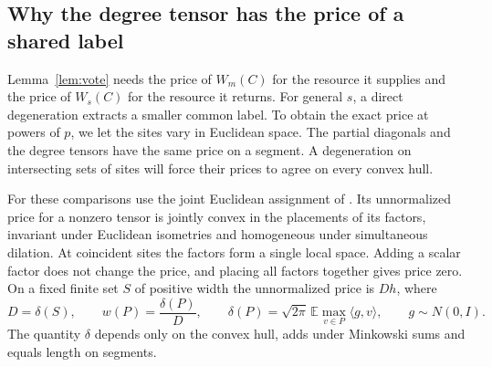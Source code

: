\subsection{Why the degree tensor has the price of a shared label}\label{sec:degree}

Lemma~\ref{lem:vote} needs the price of \(W_m(C)\) for the resource it
supplies and the price of \(W_s(C)\) for the resource it returns. For
general \(s\), a direct degeneration extracts a smaller common label.
To obtain the exact price at powers of \(p\), we let the sites vary in
Euclidean space. The partial diagonals and the degree tensors have
the same price on a segment. A degeneration on intersecting sets of
sites will force their prices to agree on every convex hull.

For these comparisons use the joint Euclidean assignment of
\cite[Theorem~ and Proposition~]{oaG}.
Its unnormalized price for a nonzero tensor is jointly convex in
the placements of its factors, invariant under Euclidean isometries
and homogeneous under simultaneous dilation. At coincident sites the
factors form a single local space. Adding a scalar factor does not
change the price, and placing all factors together gives price zero.
On a fixed finite set \(S\) of positive width the unnormalized price
is \(D h\), where
\begin{equation}\label{eq:euclidean-price}
 D=\delta(S),\qquad
 w(P)=\frac{\delta(P)}{D},\qquad
 \delta(P)=\sqrt{2\pi}\,\mathbb E\max_{v\in P}\langle g,v\rangle ,
 \qquad g\sim N(0,I).
\end{equation}
The quantity \(\delta\) depends only on the convex hull, adds under
Minkowski sums and equals length on segments.

